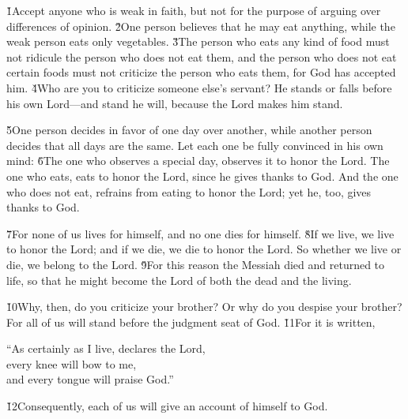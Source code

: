 \v{1}Accept anyone who is weak in faith, but not for the purpose of arguing over differences of opinion. \v{2}One person believes that he may eat anything, while the weak person eats only vegetables. \v{3}The person who eats any kind of food must not ridicule the person who does not eat them, and the person who does not eat certain foods must not criticize the person who eats them, for God has accepted him. \v{4}Who are you to criticize someone else's servant? He stands or falls before his own Lord---and stand he will, because the Lord makes him stand.

\v{5}One person decides in favor of one day over another, while another person decides that all days are the same. Let each one be fully convinced in his own mind: \v{6}The one who observes a special day, observes it to honor the Lord. The one who eats, eats to honor the Lord, since he gives thanks to God. And the one who does not eat, refrains from eating to honor the Lord; yet he, too, gives thanks to God.

\v{7}For none of us lives for himself, and no one dies for himself. \v{8}If we live, we live to honor the Lord; and if we die, we die to honor the Lord. So whether we live or die, we belong to the Lord. \v{9}For this reason the Messiah died and returned to life, so that he might become the Lord of both the dead and the living.

\v{10}Why, then, do you criticize your brother? Or why do you despise your brother? For all of us will stand before the judgment seat of God. \v{11}For it is written,

\begin{poetry}
\poeml ``As certainly as I live, declares the Lord, \\
\poemll    every knee will bow to me, \\
\poemlll       and every tongue will praise God.''
\end{poetry}

\v{12}Consequently, each of us will give an account of himself to God.

